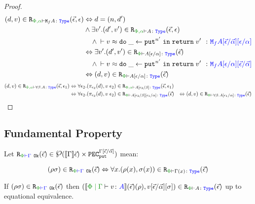 \documentclass{Report}
\newcommand{\powerset}{\raisebox{.15\baselineskip}{\Large\ensuremath{\wp}}}
\newcommand\erelates[2]{\texttt{R}_{\wellformedt{#1}{#2}}}
\newcommand\erelatesg[2]{\texttt{R}_{\wellformedok{#1}{#2}}}
\newcommand\powset[1]{\powerset(#1)}
\newcommand{\av}[0]{\vec{\a}}
\newcommand\inLogRel[5]{(#1, #2)\in\erelates{#3}{#4}(#5)}
\newcommand\inLogRelE[4]{\inLogRel{#1}{#2}{#3}{#4}{\ev}}
\newcommand{\inLogRelPE}[3]{\inLogRelE{#1}{#2}{\P}{#3}}
\newcommand{\inLogRelPEG}[3]{({#1}{#2})\in\erelatesg{\P}{#3}(\ev)}
\newcommand\fundSub[0]{\ssub{\av}{\ev}\ssi}
\newcommand\fundRho[0]{(\ev)(\rho)}
\begin{document}
\begin{proof}
    \begin{align*}
        \inLogRel{d}{v}{\P,\a}{\M{f}{A}}{\ev, \e} & \Leftrightarrow d= (n, d')
        \\ & \wedge \exists v'. \inLogRel{d'}{v'}{\P,\a}{A}{\ev, \e}
        \\ & \quad\wedge  \zberelation{v}{\doin{\_}{\put^{n'}}{\return{v'}}}{\M{f}{A}\ssub{\av}{\ev}\ssub{\a}{\e}}
        \\ & \Leftrightarrow \exists v'. \inLogRelPE{d'}{v'}{A\ssub{\a}{\e}}
        \\ & \quad\wedge  \zberelation{v}{\doin{\_}{\put^{n'}}{\return{v'}}}{\M{f}{A}\ssub{\a}{\e}\ssub{\av}{\ev}}
        \\ & \Leftrightarrow \inLogRelPE{d}{v}{A\ssub{\a}{\e}}
    \end{align*}
\case{\tquant}
\begin{align*}
    \inLogRel{d}{v}{\P,\a}{\all{\b}{A}}{\ev, \e_1} & \Leftrightarrow \forall \e_2. \inLogRel{\pi_{\e_2}(d)}{\eapp{v}{\e_2}}{\P,\a}{A\ssub{\b}{\e_2}}{\ev, \e_1}
    \\
    & \Leftrightarrow \forall \e_2. \inLogRelPE{\pi_{\e_2}(d)}{\eapp{v}{\e_2}}{A\ssub{\b}{\e_2}\ssub{\a}{\e_1}}
    & \Leftrightarrow \inLogRelPE{d}{v}{\all{\b}{A\ssub{\a}{\e_1}}}
\end{align*}

\end{proof}



\subsection{Fundamental Property}\label{FundProp}
Let $\erelatesg{\P}{\G}(\ev) \in \powset{\deno{\G}\ev)\times \pecput^{\G\ssub{\av}{\ev}}}$ mean:

\begin{equation}
    \label{LogicalRelationTypeEnvironment}
    \inLogRelPEG{\rho}{\si}{\G} \Leftrightarrow \forall x. \inLogRelPE{\rho(x)}{\si(x)}{\G(x)}
\end{equation}


\begin{theorem}
    If $\inLogRelPEG{\rho}{\si}{\G}$ then $\inLogRelPE{\deno{\gpetyperelation{v}{A}}\fundRho}{v\fundSub}{A}$ up to equational equivalence.    
\end{theorem}
\end{document}
